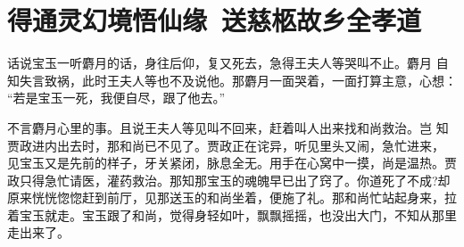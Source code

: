 \chapter{得通灵幻境悟仙缘~送慈柩故乡全孝道}

话说宝玉一听麝月的话，身往后仰，复又死去，急得王夫人等哭叫不止。麝月
自知失言致祸，此时王夫人等也不及说他。那麝月一面哭着，一面打算主意，心想：
“若是宝玉一死，我便自尽，跟了他去。”

不言麝月心里的事。且说王夫人等见叫不回来，赶着叫人出来找和尚救治。岂
知贾政进内出去时，那和尚已不见了。贾政正在诧异，听见里头又闹，急忙进来，
见宝玉又是先前的样子，牙关紧闭，脉息全无。用手在心窝中一摸，尚是温热。贾
政只得急忙请医，灌药救治。那知那宝玉的魂魄早已出了窍了。你道死了不成?却
原来恍恍惚惚赶到前厅，见那送玉的和尚坐着，便施了礼。那和尚忙站起身来，拉
着宝玉就走。宝玉跟了和尚，觉得身轻如叶，飘飘摇摇，也没出大门，不知从那里
走出来了。

